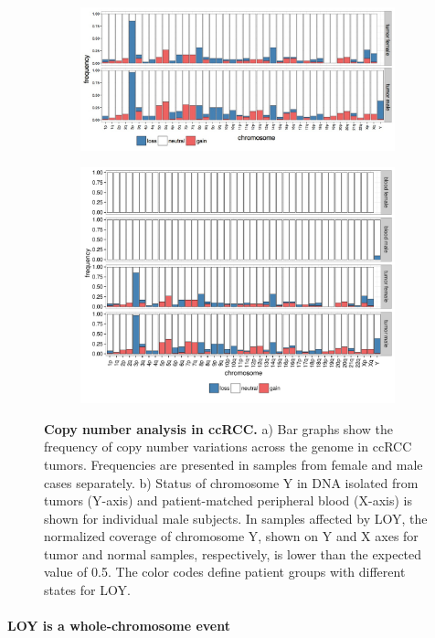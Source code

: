 \begin{figure}[htp]
  \begin{subfigure}[b]{\linewidth}
    \centering
    \includegraphics[width=.8\linewidth, page=1]{figures/LOY-fig1a.png}
    \caption{}
    \label{fig:loy1a}
  \end{subfigure}
  \begin{subfigure}[b]{\linewidth}
    \centering
    \includegraphics[width=.8\linewidth, page=2]{figures/Cagekid-LOY-fig.pdf}
    \caption{}
    \label{fig:loy1b}
  \end{subfigure}
  \caption[Copy number analysis in ccRCC.]{{\bf Copy number analysis in ccRCC.} {\small a) Bar graphs show the frequency of copy number variations across the genome in ccRCC tumors.
Frequencies are presented in samples from female and male cases separately.
b) Status of chromosome Y in DNA isolated from tumors (Y-axis) and patient-matched peripheral blood (X-axis) is shown for individual male subjects.
In samples affected by LOY, the normalized coverage of chromosome Y, shown on Y and X axes for tumor and normal samples, respectively, is lower than the expected value of 0.5.
The color codes define patient groups with different states for LOY.}}
\end{figure}

\paragraph{LOY is a whole-chromosome event}

